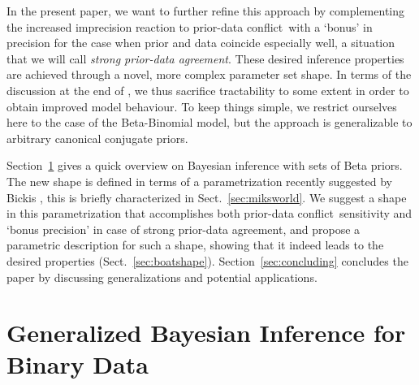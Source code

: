 \documentclass[runningheads,a4paper]{llncs}
\def\pdc{prior-data conflict}
\begin{document}
In the present paper, we want to further refine this approach
by complementing the increased imprecision reaction to \pdc\
with a `bonus' in precision for the case when prior and data coincide especially well,
a situation that we will call \emph{strong prior-data agreement}.
These desired inference properties are achieved through a novel, more complex parameter set shape.
In terms of the discussion at the end of \cite[\S~3.1.4]{2013:diss-gw},
we thus sacrifice tractability to some extent %
in order to obtain improved model behaviour.
%
To keep things simple, we restrict ourselves here to the case of the Beta-Binomial model, %
but the approach is generalizable to arbitrary canonical conjugate priors.

Section~\ref{sec:genbayes} gives a quick overview on Bayesian inference with sets of Beta priors. 
The new shape is defined in terms of a parametrization
recently suggested by Bickis \cite{2015:mik-isipta},
this is briefly characterized in Sect.~\ref{sec:miksworld}.
We suggest a shape in this parametrization that accomplishes
both \pdc\ sensitivity and `bonus precision' in case of strong prior-data agreement,
and propose a parametric description for such a shape,
showing that it indeed leads to the desired properties (Sect.~\ref{sec:boatshape}).
Section~\ref{sec:concluding} concludes the paper by discussing generalizations and potential applications. 


\section{Generalized Bayesian Inference for Binary Data}
\label{sec:genbayes}
\end{document}
